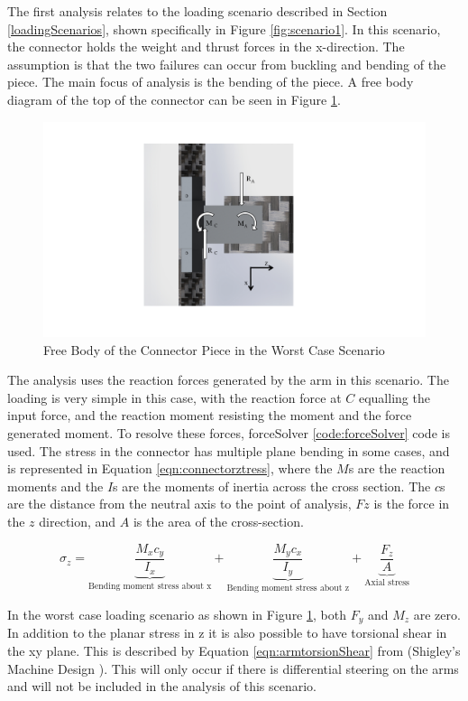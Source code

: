 \documentclass[../main.tex]{subfiles}
\begin{document}
The first analysis relates to the loading scenario described in Section \ref{loadingScenarios}, shown specifically in Figure \ref{fig:scenario1}. In this scenario, the connector holds the weight and thrust forces in the x-direction. The assumption is that the two failures can occur from buckling and bending of the piece. The main focus of analysis is the bending of the piece. A free body diagram of the top of the connector can be seen in Figure \ref{fig:armConnector}. 

\begin{figure}[H]
	\centering
	\includegraphics[page={1}, width=.7\linewidth]{img/analysis/arm/armConnector.pdf}
	\caption{Free Body of the Connector Piece in the Worst Case Scenario}
	\label{fig:armConnector}
\end{figure}


The analysis uses the reaction forces generated by the arm in this scenario. The loading is very simple in this case, with the reaction force at $C$ equalling the input force, and the reaction moment resisting the moment and the force generated moment. To resolve these forces, forceSolver \ref{code:forceSolver} code is used. The stress in the connector has multiple plane bending in some cases, and is represented in Equation \ref{eqn:connectorztress}, where the $M$s are the reaction moments and the $I$s are the moments of inertia across the cross section. The $c$s are the distance from the neutral axis to the point of analysis, $Fz$ is the force in the $z$ direction, and $A$ is the area of the cross-section.

\begin{equation}
\label{eqn:connectorztress}
\sigma_{z}=  \underbrace{\frac{M_{x}c_y}{I_x}}_\text{Bending moment stress about x} + \underbrace{\frac{M_{y}c_x}{I_y}}_\text{Bending moment stress about z} + \underbrace{\frac{F_z}{A}}_\text{Axial stress} 
\end{equation}

In the worst case loading scenario as shown in Figure \ref{fig:armConnector}, both $F_y$ and $M_z$ are zero. In addition to the planar stress in z it is also possible to have torsional shear in the xy plane. This is described by Equation \ref{eqn:armtorsionShear} from {(Shigley's Machine Design \cite[102]{shigley})}. This will only occur if there is differential steering on the arms and will not be included in the analysis of this scenario.
\end{document}
